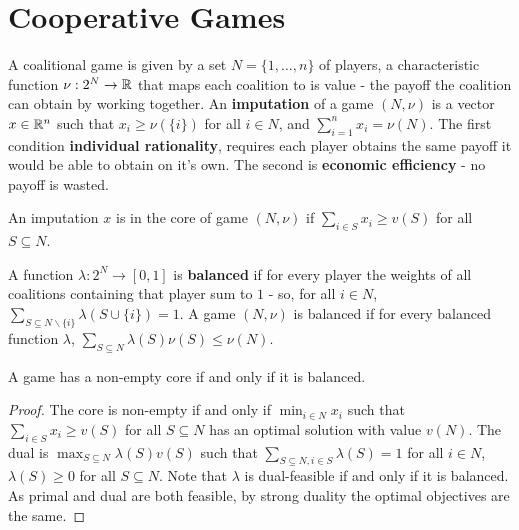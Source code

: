 \section{Cooperative Games}
\label{sec:cooperative-games}

\begin{defn}
  \label{sec:cooperative-games-1}
  A coalitional game is given by a set $N = \{ 1, \dots, n \} $ of
  players, a characteristic function $\nu: 2^{N} \rightarrow \mathbb{R}$ that
  maps each coalition to is value - the payoff the coalition can obtain
  by working together.  An \textbf{imputation} of a game $(N, \nu)$ is a
  vector $x \in \mathbb{R}^{n}$ such that $x_{i} \geq \nu(\{ i \} )$ for all $i
  \in N$, and $\sum_{i=1}^{n} x_{i} = \nu(N)$.  The first condition
  \textbf{individual rationality}, requires each player obtains the
  same payoff it would be able to obtain on it's own.  The second is
  \textbf{economic efficiency} - no payoff is wasted.
\end{defn}


\begin{defn}
  \label{sec:cooperative-games-4}
  An imputation $x$ is in the core of game $(N, \nu)$ if $\sum_{i \in
    S}^{} x_{i} \geq v(S)$ for all $S \subseteq N$.
\end{defn}

\begin{defn}
  \label{sec:cooperative-games-2}
  A function $\lambda: 2^{N} \rightarrow [0, 1]$ is \textbf{balanced}
  if for every player the weights of all coalitions containing that
  player sum to $1$ - so, for all $i \in N$, $\sum_{S \subseteq N
    \backslash \{ i \} }^{} \lambda(S \cup \{ i \}) = 1$.  A game $(N,
  \nu)$ is balanced if for every balanced function $\lambda$, $\sum_{S
    \subseteq N}^{} \lambda(S) \nu(S) \leq \nu(N)$.
\end{defn}

\begin{thm}
  \label{sec:cooperative-games-3}
  A game has a non-empty core if and only if it is balanced.
\end{thm}

\begin{proof}
  The core is non-empty if and only if $\min_{i \in N} x_{i}$ such
  that $\sum_{i \in S} x_{i} \geq v(S)$ for all $S \subseteq N$ has an
  optimal solution with value $v(N)$. The dual is $\max_{S \subseteq N}
  \lambda(S) v(S)$ such that $\sum_{S \subseteq N, i \in S} \lambda(S)
  = 1$ for all $i \in N$, $\lambda(S) \geq 0$ for all $S \subseteq N$.
  Note that $\lambda$ is dual-feasible if and only if it is balanced.
  As primal and dual are both feasible, by strong duality the optimal
  objectives are the same.
\end{proof}


